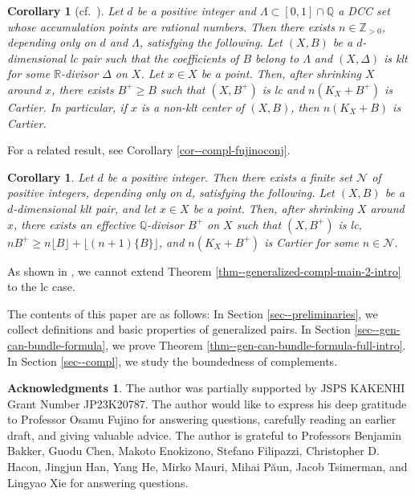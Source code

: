 \documentclass[12pt]{amsart}
\newtheorem{cor}[thm]{Corollary}
\theoremstyle{definition}
\newtheorem*{ack}{Acknowledgments}
\begin{document}
\begin{cor}[cf.~{\cite[Corollary 1.9]{birkar-compl}}]\label{cor--generalized-compl-main-1-intro}
Let $d$ be a positive integer and $\Lambda  \subset [0,1] \cap \mathbb{Q}$ a DCC set whose accumulation points are rational numbers. 
Then there exists $n \in \mathbb{Z}_{>0}$, depending only on $d$ and $\Lambda$, satisfying the following. 
Let $(X,B)$ be a $d$-dimensional lc pair such that the coefficients of $B$ belong to $\Lambda$ and $(X,\Delta)$ is klt for some $\mathbb{R}$-divisor $\Delta$ on $X$. 
Let $x \in X$ be a point. 
Then, after shrinking $X$ around $x$, there exists $B^{+} \geq B$ such that $(X,B^{+})$ is lc and $n(K_{X}+B^{+})$ is Cartier. 
In particular, if $x$ is a non-klt center of $(X,B)$, then $n(K_{X}+B)$ is Cartier. 
\end{cor}

For a related result, see Corollary \ref{cor--compl-fujinoconj}. 

\begin{cor}\label{cor--generalized-compl-main-2-intro}
Let $d$ be a positive integer. 
Then there exists a finite set $\mathcal{N}$ of positive integers, depending only on $d$, satisfying the following. 
Let $(X,B)$ be a $d$-dimensional klt pair, and let $x \in X$ be a point. 
Then, after shrinking $X$ around $x$, there exists an effective $\mathbb{Q}$-divisor $B^{+}$ on $X$ such that $(X,B^{+})$ is lc, $nB^{+} \geq n\lfloor B \rfloor+\lfloor (n+1)\{B\} \rfloor$, and $n(K_{X}+B^{+})$ is Cartier for some $n \in \mathcal{N}$. 
\end{cor}

As shown in \cite[Chapter 11, Example 11]{shokurov-compl}, we cannot extend Theorem \ref{thm--generalized-compl-main-2-intro} to the lc case. 

The contents of this paper are as follows: 
In Section \ref{sec--preliminaries}, we collect definitions and basic properties of generalized pairs. 
In Section \ref{sec--gen-can-bundle-formula}, we prove Theorem \ref{thm--gen-can-bundle-formula-full-intro}. 
In Section \ref{sec--compl}, we study the boundedness of complements. 

\begin{ack}
The author was partially supported by JSPS KAKENHI Grant Number JP23K20787. 
The author would like to express his deep gratitude to Professor Osamu Fujino for answering questions, carefully reading an earlier draft, and giving valuable advice. The author is grateful to Professors Benjamin Bakker, Guodu Chen, Makoto Enokizono, Stefano Filipazzi, Christopher D. Hacon, Jingjun Han, Yang He, Mirko Mauri, Mihai P\u{a}un, Jacob Tsimerman, and Lingyao Xie for answering questions.
\end{ack}
\end{document}
